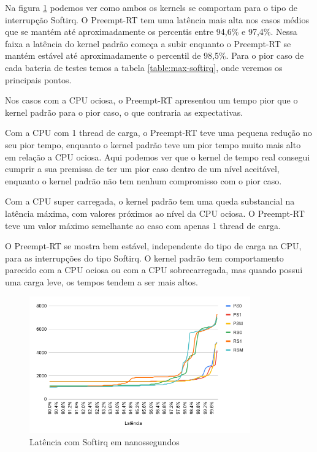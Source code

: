 Na figura \ref{grafico:softirq} podemos ver como ambos os kernels se comportam para o tipo de interrupção Softirq. O Preempt-RT tem uma latência mais alta nos casos médios que se mantém até aproximadamente os percentis entre 94,6\% e 97,4\%. Nessa faixa a latência do kernel padrão começa a subir enquanto o Preempt-RT se mantém estável até aproximadamente o percentil de 98,5\%. Para o pior caso de cada bateria de testes temos a tabela \ref{table:max-softirq}, onde veremos os principais pontos.

Nos casos com a CPU ociosa, o Preempt-RT apresentou um tempo pior que o kernel padrão para o pior caso, o que contraria as expectativas.

Com a CPU com 1 thread de carga, o Preempt-RT teve uma pequena redução no seu pior tempo, enquanto o kernel padrão teve um pior tempo muito mais alto em relação a CPU ociosa. Aqui podemos ver que o kernel de tempo real consegui cumprir a sua premissa de ter um pior caso dentro de um nível aceitável, enquanto o kernel padrão não tem nenhum compromisso com o pior caso.

Com a CPU super carregada, o kernel padrão tem uma queda substancial na latência máxima, com valores próximos ao nível da CPU ociosa. O Preempt-RT teve um valor máximo semelhante ao caso com apenas 1 thread de carga.

O Preempt-RT se mostra bem estável, independente do tipo de carga na CPU, para as interrupções do tipo Softirq. O kernel padrão tem comportamento parecido com a CPU ociosa ou com a CPU sobrecarregada, mas quando possui uma carga leve, os tempos tendem a ser mais altos.

\begin{figure}[!htb]
    \centering
    \includegraphics[width=0.85\textwidth]{graficos/softirq.png}
    \caption{Latência com Softirq em nanossegundos}
    \label{grafico:softirq}
\end{figure}

